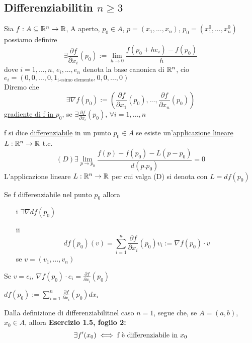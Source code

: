 \subsection{Differenziabilit\aca in $n\geq 3$}
Sia $f: A \subseteq \mathbb{R}^n \to \mathbb{R}$, A aperto, $p_0 \in A$, $p = (x_1,...,x_n)$, $p_0 = (x_1^0, ..., x_n^0)$ possiamo definire
$$\exists \frac{\partial f}{\partial x_i}(p_0) := \lim_{h\to 0} \frac{f(p_0+he_i)-f(p_0)}{h}$$
dove $i = 1,...,n$, $e_i,...,e_n$ denota la base canonica di $\mathbb{R}^n$, cio\ace $e_i = (0,0,...,0,1_{\text{i-esimo elemento}},0,0,...,0)$\\
Diremo che 
$$\exists\nabla f(p_0) := \left(\frac{\partial f}{\partial x_1}(p_0), ..., \frac{\partial f}{\partial x_n}(p_0)\right)$$
\underline{gradiente di f in $p_0$}, se $\exists\frac{\partial f}{\partial x_i}(p_0)$, $\forall i = 1,...,n$
\begin{definition}
  f si dice \underline{differenziabile} in un punto $p_0 \in A$ se esiste un'\underline{applicazione lineare} $L :\mathbb{R}^n \to \mathbb{R}$
  t.c. 
  $$(D) \exists \lim_{p \to p_0} \frac{f(p) -f(p_0)-L(p-p_0)}{d(p.p_0)} = 0$$
  L'applicazione lineare $L:\mathbb{R}^n \to \mathbb{R}$ per cui valga (D) si denota con $L = df(p_0)$
\end{definition}
\begin{proposition}[11.4]
  Se f \ace differenziabile nel punto $p_0$ allora 
  \begin{itemize}
    \item[i] $\exists\nabla df(p_0)$
    \item[ii] $$df(p_0)(v) = \sum_{i=1}^{n} \frac{\partial f}{\partial x_i}(p_0)v_i := \nabla f(p_0) \cdot v$$
        se $v = (v_1,...,v_n)$
  \end{itemize}
\end{proposition}
\begin{osservazione}
  Se $v = e_i$, $\nabla f(p_0)\cdot e_i = \frac{\partial f}{\partial x_i} (p_0)$
\end{osservazione}
\begin{notazione}
  $df(p_0) := \sum_{i=1}^{n} \frac{\partial f}{\partial x_i}(p_0) dx_i$
\end{notazione}
\begin{osservazione}
  Dalla definizione di differenziabilit\aca nel caso $n=1$, segue che, se $A = (a,b)$, $x_0 \in A$, allora 
  \textbf{Esercizio 1.5, foglio 2:} 
  $$\exists f'(x_0) \iff \text{f \`e differenziabile in }x_0$$
\end{osservazione}
